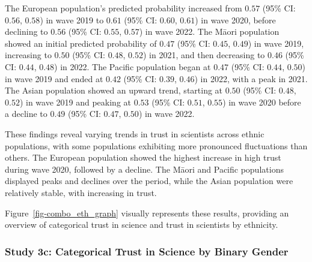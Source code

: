 \documentclass[
  single column]{article}
\begin{document}
The European population's predicted probability increased from \(0.57\)
(95\% CI: \(0.56\), \(0.58\)) in wave 2019 to \(0.61\) (95\% CI:
\(0.60\), \(0.61\)) in wave 2020, before declining to \(0.56\) (95\% CI:
\(0.55\), \(0.57\)) in wave 2022. The Māori population showed an initial
predicted probability of \(0.47\) (95\% CI: \(0.45\), \(0.49\)) in wave
2019, increasing to \(0.50\) (95\% CI: \(0.48\), \(0.52\)) in 2021, and
then decreasing to \(0.46\) (95\% CI: \(0.44\), \(0.48\)) in 2022. The
Pacific population began at \(0.47\) (95\% CI: \(0.44\), \(0.50\)) in
wave 2019 and ended at \(0.42\) (95\% CI: \(0.39\), \(0.46\)) in 2022,
with a peak in 2021. The Asian population showed an upward trend,
starting at \(0.50\) (95\% CI: \(0.48\), \(0.52\)) in wave 2019 and
peaking at \(0.53\) (95\% CI: \(0.51\), \(0.55\)) in wave 2020 before a
decline to \(0.49\) (95\% CI: \(0.47\), \(0.50\)) in wave 2022.

These findings reveal varying trends in trust in scientists across
ethnic populations, with some populations exhibiting more pronounced
fluctuations than others. The European population showed the highest
increase in high trust during wave 2020, followed by a decline. The
Māori and Pacific populations displayed peaks and declines over the
period, while the Asian population were relatively stable, with
increasing in trust.

Figure~\ref{fig-combo_eth_graph} visually represents these results,
providing an overview of categorical trust in science and trust in
scientists by ethnicity.

\subsubsection{Study 3c: Categorical Trust in Science by Binary
Gender}\label{study-3c-categorical-trust-in-science-by-binary-gender}
\end{document}
